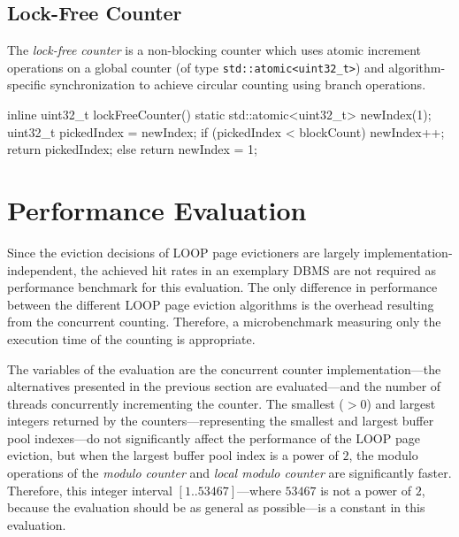 \subsection[Lock-Free Counter]{Lock-Free Counter} \label{subsec:clunky_counter}

    The \emph{lock-free counter} is a non-blocking counter which uses atomic increment operations on a global counter (of type \lstinline{std::atomic<uint32_t>}) and algorithm-specific synchronization to achieve circular counting using branch operations.

\begin{@empty}
    \lstset{
        language = [ISO]C++
    }
\begin{centeredshadowboxlisting}
inline uint32_t lockFreeCounter() {
    static std::atomic<uint32_t> newIndex(1);
    uint32_t pickedIndex = newIndex;
    if (pickedIndex < blockCount) {
        newIndex++;
        return pickedIndex;
    } else {
        return newIndex = 1;
    }
}
\end{centeredshadowboxlisting}
\end{@empty}

\section[Performance Evaluation]{Performance Evaluation} \label{sec:loop-performance}

    Since the eviction decisions of LOOP page evictioners are largely im\-ple\-men\-ta\-tion-independent, the achieved hit rates in an exemplary DBMS are not required as performance benchmark for this evaluation. The only difference in performance between the different LOOP page eviction algorithms is the overhead resulting from the concurrent counting. Therefore, a microbenchmark measuring only the execution time of the counting is appropriate.

    The variables of the evaluation are the concurrent counter im\-ple\-men\-ta\-tion---the alternatives presented in the previous section are evaluated---and the number of threads concurrently incrementing the counter. The smallest ($>0$) and largest integers returned by the counters---representing the smallest and largest buffer pool indexes---do not significantly affect the performance of the LOOP page eviction, but when the largest buffer pool index is a power of $2$, the modulo operations of the \emph{modulo counter} and \emph{local modulo counter} are significantly faster. Therefore, this integer interval $\left[1 .. 53467\right]$---where $53467$ is not a power of $2$, because the evaluation should be as general as possible---is a constant in this evaluation.

